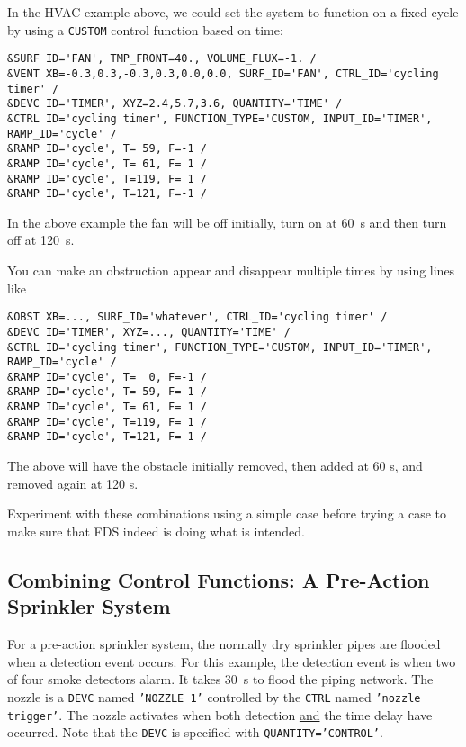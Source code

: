 \documentclass[11pt]{book}
\newcommand{\ct}{\tt\small}
\begin{document}
\noindent
In the HVAC
example above, we could set the system to function
on a fixed cycle by using a {\ct CUSTOM} control function based on time:

\footnotesize
\begin{verbatim}
&SURF ID='FAN', TMP_FRONT=40., VOLUME_FLUX=-1. /
&VENT XB=-0.3,0.3,-0.3,0.3,0.0,0.0, SURF_ID='FAN', CTRL_ID='cycling timer' /
&DEVC ID='TIMER', XYZ=2.4,5.7,3.6, QUANTITY='TIME' /
&CTRL ID='cycling timer', FUNCTION_TYPE='CUSTOM, INPUT_ID='TIMER', RAMP_ID='cycle' /
&RAMP ID='cycle', T= 59, F=-1 /
&RAMP ID='cycle', T= 61, F= 1 /
&RAMP ID='cycle', T=119, F= 1 /
&RAMP ID='cycle', T=121, F=-1 /
\end{verbatim} \normalsize

\noindent
In the above example the fan will be off initially, turn on at 60~s and then turn off at 120~s.

You can make an obstruction appear and disappear multiple times by using lines like

\footnotesize
\begin{verbatim}
&OBST XB=..., SURF_ID='whatever', CTRL_ID='cycling timer' /
&DEVC ID='TIMER', XYZ=..., QUANTITY='TIME' /
&CTRL ID='cycling timer', FUNCTION_TYPE='CUSTOM, INPUT_ID='TIMER', RAMP_ID='cycle' /
&RAMP ID='cycle', T=  0, F=-1 /
&RAMP ID='cycle', T= 59, F=-1 /
&RAMP ID='cycle', T= 61, F= 1 /
&RAMP ID='cycle', T=119, F= 1 /
&RAMP ID='cycle', T=121, F=-1 /
\end{verbatim}

\normalsize
\noindent
The above will have the obstacle initially removed, then added at 60 s, and removed again at 120 s.

Experiment with these combinations using a simple
case before trying a case to make sure that FDS indeed is doing what is intended.


\subsection{Combining Control Functions: A Pre-Action Sprinkler System}

For a pre-action sprinkler system, the normally
dry sprinkler pipes are flooded when a detection event occurs. For this example, the detection event is
when two of four smoke detectors alarm.  It takes 30~s to flood the piping network.
The nozzle is a {\ct DEVC} named {\ct 'NOZZLE 1'} controlled by the {\ct CTRL} named {\ct 'nozzle trigger'}.
The nozzle activates when both detection \underline{and} the time delay have occurred.  Note that the {\ct DEVC} is
specified with {\ct QUANTITY='CONTROL'}.
\end{document}
